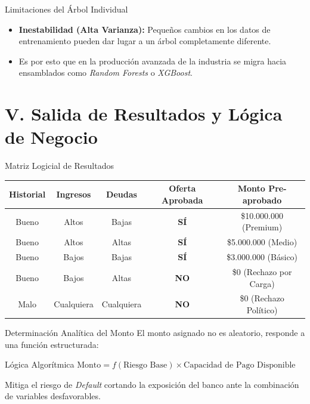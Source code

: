 \documentclass[10pt, aspectratio=169]{beamer}
\begin{document}
	\begin{frame}{Limitaciones del Árbol Individual}
		\begin{itemize}
			\item \textbf{Inestabilidad (Alta Varianza):} Pequeños cambios en los datos de entrenamiento pueden dar lugar a un árbol completamente diferente.
			\item Es por esto que en la producción avanzada de la industria se migra hacia ensamblados como \textit{Random Forests} o \textit{XGBoost}.
		\end{itemize}
	\end{frame}
	
	\section{V. Salida de Resultados y Lógica de Negocio}
	
	\begin{frame}{Matriz Logicial de Resultados}
		\begin{table}[]
			\small
			\begin{tabular}{ccccc}
				\toprule
				\textbf{Historial} & \textbf{Ingresos} & \textbf{Deudas} & \textbf{Oferta Aprobada} & \textbf{Monto Pre-aprobado} \\ \midrule
				Bueno & Altos & Bajas & \textbf{SÍ} & \$10.000.000 (Premium) \\
				Bueno & Altos & Altas & \textbf{SÍ} & \$5.000.000 (Medio) \\
				Bueno & Bajos & Bajas & \textbf{SÍ} & \$3.000.000 (Básico) \\
				Bueno & Bajos & Altas & \textbf{NO} & \$0 (Rechazo por Carga) \\
				Malo & Cualquiera & Cualquiera & \textbf{NO} & \$0 (Rechazo Político) \\ \bottomrule
			\end{tabular}
		\end{table}
	\end{frame}
	
	\begin{frame}{Determinación Analítica del Monto}
		El monto asignado no es aleatorio, responde a una función estructurada:
		\vspace{0.3cm}
		\begin{block}{Lógica Algorítmica}
			$\text{Monto} = f(\text{Riesgo Base}) \times \text{Capacidad de Pago Disponible}$
		\end{block}
		\vspace{0.2cm}
		Mitiga el riesgo de \textit{Default} cortando la exposición del banco ante la combinación de variables desfavorables.
	\end{frame}
	
\end{document}
